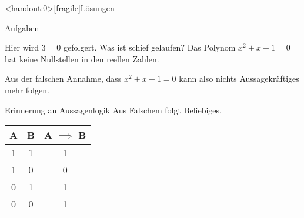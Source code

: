 {
\begin{frame}<handout:0>[fragile]{Lösungen}
	\begin{alertblock}{Aufgaben}
		\small{
			\begin{block}{Hier wird $3=0$ gefolgert. Was ist schief gelaufen?}
				Das Polynom $x^2 + x + 1 = 0$ hat keine Nullstellen in den reellen Zahlen.

				Aus der falschen Annahme, dass $x^2 + x + 1 = 0$ kann also nichts Aussagekräftiges mehr folgen.
			\end{block}
			\begin{alertblock}{Erinnerung an Aussagenlogik}
				Aus Falschem folgt Beliebiges.\\
				\begin{table}
					\begin{tabular}{ccc}
						\toprule
						A         & B         & A $\implies$ B \\
						\midrule
						1         & 1         & 1              \\
						1         & 0         & 0              \\
						\alert{0} & \alert{1} & \alert{1}      \\
						\alert{0} & \alert{0} & \alert{1}      \\
						\bottomrule
					\end{tabular}
				\end{table}
			\end{alertblock}
		}
	\end{alertblock}
\end{frame}
}